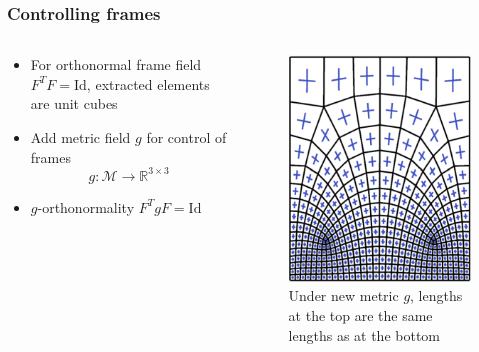 \documentclass[
	11pt, %
	aspectratio=169, %
]{beamer}
\begin{document}
\begin{frame}
	\frametitle{Controlling frames}
	\begin{columns}[c] %
	
		\begin{column}{0.5\textwidth} %
			\begin{itemize}
				\item For orthonormal frame field $F^TF = \mathrm{Id}$, extracted elements are unit cubes
				\item Add metric field $g$ for control of frames
				$$g:\mathcal{M}\to \mathbb{R}^{3\times3}$$
				\item $g$-orthonormality $F^TgF = \mathrm{Id}$
			\end{itemize}
		\end{column}
		\begin{column}{0.45\textwidth} %
			\begin{figure}
				\includegraphics[width=0.6\linewidth]{factorization.png}
				\caption{Under new metric $g$, lengths at the top are the same lengths as at the bottom \cite{fang}}
			\end{figure}
		\end{column}
	\end{columns}
\end{frame}

	
\end{document}
